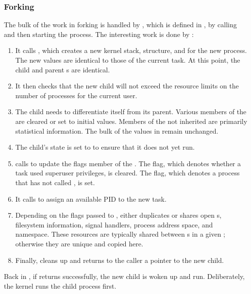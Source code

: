\subsubsection{Forking}\label{subsubsec:Forking}
The bulk of the work in forking is handled by , which is defined in , by calling  and then starting the process.
The interesting work is done by :
\begin{enumerate}
\item It calls , which creates a new kernel stack,  structure, and  for the new process.
  The new values are identical to those of the current task.
  At this point, the child and parent s are identical.
\item It then checks that the new child will not exceed the resource limits on the number of processes for the current user.
\item The child needs to differentiate itself from its parent.
  Various members of the  are cleared or set to initial values.
  Members of the  not inherited are primarily statistical information.
  The bulk of the values in  remain unchanged.
\item The child’s state is set to  to ensure that it does not yet run.
\item {} calls  to update the flags member of the .
  The  flag, which denotes whether a task used superuser privileges, is cleared.
  The  flag, which denotes a process that has not called , is set.
\item It calls  to assign an available PID to the new task.
\item Depending on the flags passed to ,  either duplicates or shares open s, filesystem information, signal handlers, process address space, and namespace.
  These resources are typically shared between s in a given ; otherwise they are unique and copied here.
\item Finally,  cleans up and returns to the caller a pointer to the new child.
\end{enumerate}

Back in , if  returns successfully, the new child is woken up and run.
Deliberately, the kernel runs the child process first.

